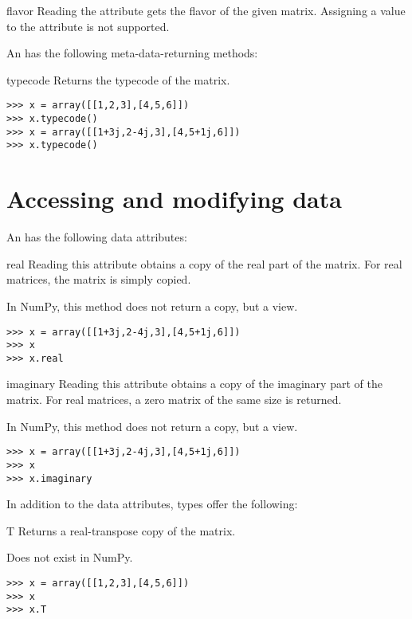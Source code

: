 \begin{memberdesc}[Array]{flavor}
  Reading the  attribute gets the flavor of the given
  matrix. Assigning a value to the  attribute is not supported.
\end{memberdesc}

An  has the following meta-data-returning methods:

\begin{methoddesc}[Array]{typecode}{}
  Returns the typecode of the matrix.
\begin{verbatim}
>>> x = array([[1,2,3],[4,5,6]])
>>> x.typecode()
>>> x = array([[1+3j,2-4j,3],[4,5+1j,6]])
>>> x.typecode()
\end{verbatim}
\end{methoddesc}

\section{Accessing and modifying  data}

An  has the following data attributes:

\begin{memberdesc}[Array]{real}
  Reading this attribute obtains a copy of the real part of the matrix.
  For real matrices, the matrix is simply copied.

  In NumPy, this method does not return a copy, but a view.
\begin{verbatim}
>>> x = array([[1+3j,2-4j,3],[4,5+1j,6]])
>>> x
>>> x.real
\end{verbatim}
\end{memberdesc}

\begin{memberdesc}[Array]{imaginary}
  Reading this attribute obtains a copy of the imaginary part of the matrix.
  For real matrices, a zero matrix of the same size is returned.

  In NumPy, this method does not return a copy, but a view.
\begin{verbatim}
>>> x = array([[1+3j,2-4j,3],[4,5+1j,6]])
>>> x
>>> x.imaginary
\end{verbatim}
\end{memberdesc}

In addition to the  data attributes,  types
offer the following:

\begin{memberdesc}[Matrix]{T}
  Returns a real-transpose copy of the matrix.

  Does not exist in NumPy.
\begin{verbatim}
>>> x = array([[1,2,3],[4,5,6]])
>>> x
>>> x.T
\end{verbatim}
\end{memberdesc}

